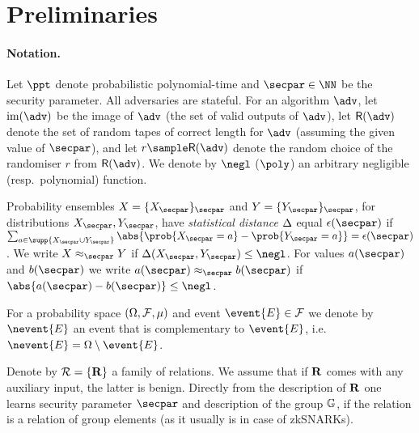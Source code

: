 \section{Preliminaries}
\label{sec:preliminaries}
\paragraph{Notation.} Let $\ppt$ denote probabilistic polynomial-time and $\secpar \in \NN$ be the
security parameter. All adversaries are stateful. For an algorithm $\adv$, let
$\image (\adv)$ be the image of $\adv$ (the set of valid outputs of $\adv$), let
$\RND{\adv}$ denote the set of random tapes of correct length for $\adv$
(assuming the given value of $\secpar$), and let $r \sample \RND{\adv}$ denote
the random choice of the randomiser $r$ from $\RND{\adv}$. We denote by $\negl$
($\poly$) an arbitrary negligible (resp.~polynomial) function.

Probability ensembles $X = \smallset{X_\secpar}_\secpar$ and $Y =
\smallset{Y_\secpar}_\secpar$, for distributions $X_\secpar, Y_\secpar$, have
\emph{statistical distance} $\Delta$ equal $\epsilon(\secpar)$ if $\sum_{a \in
  \supp{X_\secpar \cup Y_\secpar}} \abs{\prob{X_\secpar = a} - \prob{Y_\secpar =
    a}} = \epsilon(\secpar)$. We write $X \approx_\secpar Y$ if $\SD(X_\secpar,
Y_\secpar) \leq \negl$. For values $a(\secpar)$ and $b(\secpar)$ we write
$a(\secpar) \approx_\secpar b(\secpar)$ if $\abs{a(\secpar) - b(\secpar)} \leq
\negl$.

For a probability space $(\Omega, \mathcal{F}, \mu)$ and event
$\event{E} \in \eventspace$ we denote by $\nevent{E}$ an event that is
complementary to $\event{E}$,
i.e.~$\nevent{E} = \samplespace \setminus \event{E}$.

Denote by $\mathcal{R} = \{\mathbf{R}\}$ a family of relations. We assume that if
$\mathbf{R}$ comes with any auxiliary input, the latter is benign. Directly from the
description of $\mathbf{R}$ one learns security parameter $\secpar$ and description of the
group $\mathbb{G}$, if the relation is a relation of group elements (as it usually is
in case of zkSNARKs).

